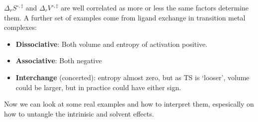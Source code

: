 $\Delta_rS^{\circ,\ddag}$ and $\Delta_rV^{\circ,\ddag}$ are well correlated as more or less the same factors determine them. A further set of examples come from ligand exchange in transition metal complexes:
\begin{itemize}
  \item \textbf{Dissociative}: Both volume and entropy of activation positive.
  \item \textbf{Associative}: Both negative
  \item \textbf{Interchange} (concerted): entropy almost zero, but as TS is `looser', volume could be larger, but in practice could have either sign.
\end{itemize}
Now we can look at some real examples and how to interpret them, espesically on how to untangle the intrinisic and solvent effects.\par

